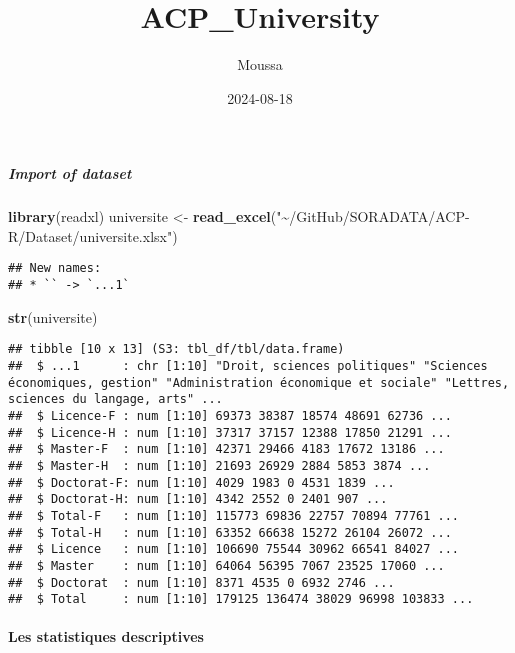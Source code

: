 \documentclass[
]{article}
\title{ACP\_University}
\author{Moussa}
\date{2024-08-18}
\newenvironment{Shaded}{\begin{snugshade}}{\end{snugshade}}
\newcommand{\FunctionTok}[1]{\textcolor[rgb]{0.13,0.29,0.53}{\textbf{#1}}}
\newcommand{\NormalTok}[1]{#1}
\newcommand{\OtherTok}[1]{\textcolor[rgb]{0.56,0.35,0.01}{#1}}
\newcommand{\StringTok}[1]{\textcolor[rgb]{0.31,0.60,0.02}{#1}}
\begin{document}
\maketitle

\hypertarget{import-of-dataset}{%
\subparagraph{Import of dataset}\label{import-of-dataset}}

\begin{Shaded}
\begin{Highlighting}[]
\FunctionTok{library}\NormalTok{(readxl)}
\NormalTok{universite }\OtherTok{\textless{}{-}} \FunctionTok{read\_excel}\NormalTok{(}\StringTok{"\textasciitilde{}/GitHub/SORADATA/ACP{-}R/Dataset/universite.xlsx"}\NormalTok{)}
\end{Highlighting}
\end{Shaded}

\begin{verbatim}
## New names:
## * `` -> `...1`
\end{verbatim}

\begin{Shaded}
\begin{Highlighting}[]
\FunctionTok{str}\NormalTok{(universite)}
\end{Highlighting}
\end{Shaded}

\begin{verbatim}
## tibble [10 x 13] (S3: tbl_df/tbl/data.frame)
##  $ ...1      : chr [1:10] "Droit, sciences politiques" "Sciences économiques, gestion" "Administration économique et sociale" "Lettres, sciences du langage, arts" ...
##  $ Licence-F : num [1:10] 69373 38387 18574 48691 62736 ...
##  $ Licence-H : num [1:10] 37317 37157 12388 17850 21291 ...
##  $ Master-F  : num [1:10] 42371 29466 4183 17672 13186 ...
##  $ Master-H  : num [1:10] 21693 26929 2884 5853 3874 ...
##  $ Doctorat-F: num [1:10] 4029 1983 0 4531 1839 ...
##  $ Doctorat-H: num [1:10] 4342 2552 0 2401 907 ...
##  $ Total-F   : num [1:10] 115773 69836 22757 70894 77761 ...
##  $ Total-H   : num [1:10] 63352 66638 15272 26104 26072 ...
##  $ Licence   : num [1:10] 106690 75544 30962 66541 84027 ...
##  $ Master    : num [1:10] 64064 56395 7067 23525 17060 ...
##  $ Doctorat  : num [1:10] 8371 4535 0 6932 2746 ...
##  $ Total     : num [1:10] 179125 136474 38029 96998 103833 ...
\end{verbatim}

\hypertarget{les-statistiques-descriptives}{%
\paragraph{Les statistiques
descriptives}\label{les-statistiques-descriptives}}
\end{document}
